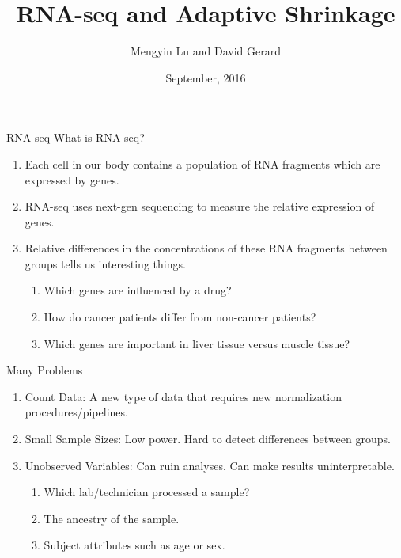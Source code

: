 \documentclass[evncountsect]{beamer}
\title{RNA-seq and Adaptive Shrinkage}
\author{Mengyin Lu and David Gerard}
\institute[UChicago]{
  Department of Human Genetics\\
  University of Chicago\\
  Boss: Matthew Stephens
}
\date[September 2016]{September, 2016}
\begin{document}
\begin{frame}
  \titlepage
\end{frame}

\begin{frame}{RNA-seq}
  What is RNA-seq?
  \begin{enumerate}
  \item Each cell in our body contains a population of RNA fragments
    which are expressed by genes.
  \item RNA-seq uses next-gen sequencing to measure the relative
    expression of genes.
  \item Relative differences in the concentrations of these RNA
    fragments between groups tells us interesting things.
    \begin{enumerate}
    \item Which genes are influenced by a drug?
    \item How do cancer patients differ from non-cancer patients?
    \item Which genes are important in liver tissue versus muscle tissue?
    \end{enumerate}
  \end{enumerate}

\end{frame}


\begin{frame}{Many Problems}
  \begin{enumerate}
  \item Count Data: A new type of data that requires new normalization
    procedures/pipelines.
  \item Small Sample Sizes: Low power. Hard to detect differences between groups.
  \item Unobserved Variables: Can ruin analyses. Can make results uninterpretable.
    \begin{enumerate}
    \item Which lab/technician processed a sample?
    \item The ancestry of the sample.
    \item Subject attributes such as age or sex.
    \end{enumerate}
  \end{enumerate}
\end{frame}
\end{document}
